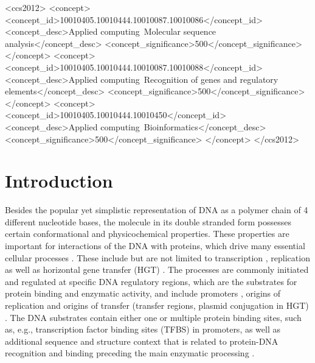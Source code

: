 \documentclass[sigconf]{acmart}
\begin{document}
\begin{CCSXML}
<ccs2012>
<concept>
<concept_id>10010405.10010444.10010087.10010086</concept_id>
<concept_desc>Applied computing~Molecular sequence analysis</concept_desc>
<concept_significance>500</concept_significance>
</concept>
<concept>
<concept_id>10010405.10010444.10010087.10010088</concept_id>
<concept_desc>Applied computing~Recognition of genes and regulatory elements</concept_desc>
<concept_significance>500</concept_significance>
</concept>
<concept>
<concept_id>10010405.10010444.10010450</concept_id>
<concept_desc>Applied computing~Bioinformatics</concept_desc>
<concept_significance>500</concept_significance>
</concept>
</ccs2012>
\end{CCSXML}



\maketitle


\section{Introduction}
Besides the popular yet simplistic representation of DNA as a polymer chain of 4 different nucleotide bases, the molecule in its double stranded form possesses certain conformational and physicochemical properties. These properties are important for interactions of the DNA with proteins, which drive many essential cellular processes \cite{Rohs2009-hm,Zrimec2015-xf,Zrimec2018-lx,Watson2008-dt}. These include but are not limited to transcription \cite{Rohs2009-hm}, replication \cite{Chen2012-gd} as well as horizontal gene transfer (HGT) \cite{Zrimec2018-lx,Zrimec2020-wx}. The processes are commonly initiated and regulated at specific DNA regulatory regions, which are the substrates for protein binding and enzymatic activity, and include promoters \cite{Watson2008-dt}, origins of replication \cite{Chen2012-gd} and origins of transfer (transfer regions, plasmid conjugation in HGT) \cite{Garcillan-Barcia2009-yk}. The DNA substrates contain either one or multiple protein binding sites, such as, e.g., transcription factor binding sites (TFBS) in promoters, as well as additional sequence and structure context that is related to protein-DNA recognition and binding preceding the main enzymatic processing \cite{Levo2015-iu,Marcovitz2013-kg,Zrimec2018-lx}.
\end{document}
